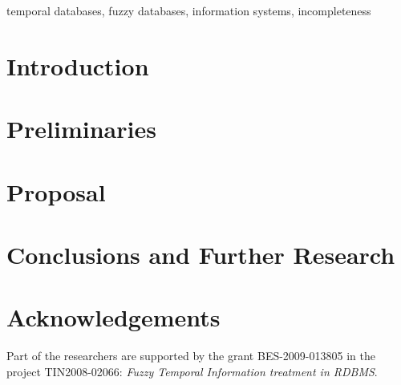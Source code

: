 \documentclass{llncs}
\begin{document}
\begin{keywords}
temporal databases, fuzzy databases, information systems, incompleteness
\end{keywords}

%
\section{Introduction}
\label{sec:Introduction}

%

\section{Preliminaries}
\label{sec:preliminaries}




\section{Proposal}
\label{sec:proposal}



%
%
%
\section{Conclusions and Further Research}
\label{sec:futher-research}

%




%
\section*{Acknowledgements}
%
Part of the researchers are supported by the grant BES-2009-013805 in the project TIN2008-02066: \emph{Fuzzy Temporal Information treatment in RDBMS}.




\end{document}

